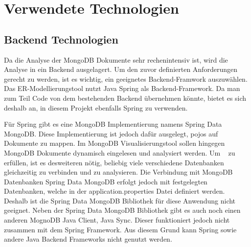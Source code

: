 \section{Verwendete Technologien}
\label{sec:verwendete_technologien}

\subsection{Backend Technologien}
\label{sec:verwendete_technologien_backend}

Da die Analyse der MongoDB Dokumente sehr rechenintensiv ist, wird die Analyse in ein Backend ausgelagert.
Um den zuvor definierten Anforderungen gerecht zu werden, ist es wichtig, ein geeignetes Backend-Framwork auszuwählen.
Das ER-Modellierungstool nutzt Java Spring als Backend-Framework.
Da man zum Teil Code von dem bestehenden Backend übernehmen könnte, bietet es sich deshalb an, in diesem Projekt ebenfalls Spring zu verwenden.

Für Spring gibt es eine MongoDB Implementierung namens Spring Data MongoDB.
Diese Implementierung ist jedoch dafür ausgelegt, \ac{pojo}s auf Dokumente zu mappen.
Im MongoDB Visualisierungstool sollen hingegen MongoDB Dokumente dynamisch eingelesen und analysiert werden.
Um ~ zu erfüllen, ist es desweiteren nötig, beliebig viele verschiedene Datenbanken gleichzeitig zu verbinden und zu analysieren.
Die Verbindung mit MongoDB Datenbanken Spring Data MongoDB erfolgt jedoch mit festgelegten Datenbanken, welche in der application.properties Datei definiert werden.
~\autocite{spring:spring-data-mongodb}
Deshalb ist die Spring Data MongoDB Bibliothek für diese Anwendung nicht geeignet.
Neben der Spring Data MongoDB Bibliothek gibt es auch noch einen anderen MognoDB Java Client, Java Sync.
Dieser funktioniert jedoch nicht zusammen mit dem Spring Framework.
Aus diesem Grund kann Spring sowie andere Java Backend Frameworks nicht genutzt werden.

